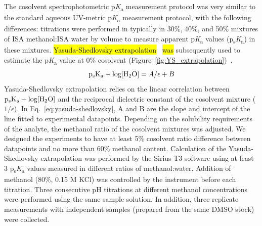 \documentclass[9pt,lineno]{elife}
\newcommand{\pKa}{p\textit{K}\textsubscript{a}}
\newcommand{\psKa}{p\textsubscript{s}\textit{K}\textsubscript{a}}
\begin{document}
The cosolvent spectrophotometric \pKa{} measurement protocol was very similar to the standard aqueous UV-metric \pKa{} measurement protocol, with the following differences: 
titrations were performed in typically in 30\%, 40\%, and 50\% mixtures of ISA methanol:ISA water by volume to measure apparent \pKa{} values (\psKa) in these mixtures. 
\hl{Yasuda-Shedlovsky extrapolation}~\citep{yasuda_dissociation_1959, shedlovsky_1962} \hl{was} subsequently used to estimate the \pKa{} value at 0\% cosolvent (Figure~\ref{fig:YS_extrapolation})~\citep{avdeef_ph-metric_1999,doi:10.1021/ac00049a010,TAKACSNOVAK1997235}. 
\begin{equation}
\mathrm{p_{s}K_{a}} + \log [\ce{H2O}]=A/\epsilon+B 
\label{eq:yasuda-shedlovsky}
\end{equation}
Yasuda-Shedlovsky extrapolation relies on the linear correlation between $\mathrm{p_{s}K_{a}} + \log [\ce{H2O}]$ and the reciprocal dielectric constant of the cosolvent mixture ($1/\epsilon$). 
In Eq.~\ref{eq:yasuda-shedlovsky}, A and B are the slope and intercept of the line fitted to experimental datapoints.  
Depending on the solubility requirements of the analyte, the methanol ratio of the cosolvent mixtures was adjusted. 
We designed the experiments to have at least 5\% cosolvent ratio difference between datapoints and no more than 60\% methanol content. 
Calculation of the Yasuda-Shedlovsky extrapolation was performed by the Sirius T3 software using at least 3 \psKa{} values measured in different ratios of methanol:water.
Addition of methanol (80\%, 0.15 M KCl) was controlled by the instrument before each titration. 
Three consecutive pH titrations at different methanol concentrations were performed using the same sample solution. 
In addition, three replicate measurements with independent samples (prepared from the same DMSO stock) were collected.
\end{document}
